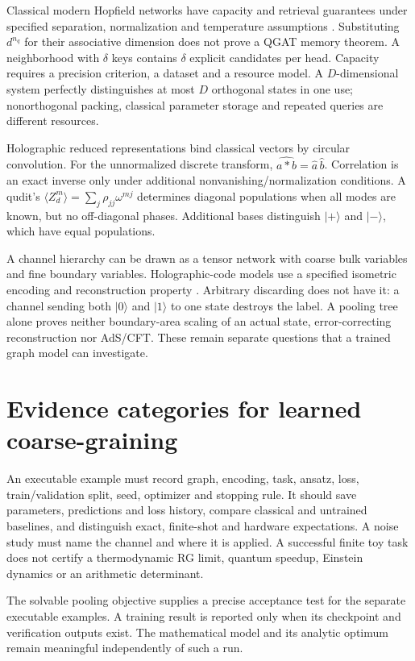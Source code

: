 \documentclass[11pt,oneside,openany]{book}
\theoremstyle{definition}\newtheorem{definition}[theorem]{Definition}
\theoremstyle{remark}\newtheorem{remark}[theorem]{Remark}
\begin{document}
Classical modern Hopfield networks have capacity and retrieval guarantees
under specified separation, normalization and temperature assumptions
\cite{PhysRamsauer}. Substituting $d^{n_q}$ for their associative dimension
does not prove a QGAT memory theorem. A neighborhood with $\delta$ keys
contains $\delta$ explicit candidates per head. Capacity requires a
precision criterion, a dataset and a resource model. A $D$-dimensional
system perfectly distinguishes at most $D$ orthogonal states in one use;
nonorthogonal packing, classical parameter storage and repeated queries
are different resources.

Holographic reduced representations bind classical vectors by circular
convolution. For the unnormalized discrete transform,
$\widehat{a*b}=\widehat a\,\widehat b$. Correlation is an exact inverse
only under additional nonvanishing/normalization conditions. A qudit's
$\langle Z_d^m\rangle=\sum_j\rho_{jj}\omega^{mj}$ determines diagonal
populations when all modes are known, but no off-diagonal phases. Additional
bases distinguish $|+\rangle$ and $|-\rangle$, which have equal populations.

A channel hierarchy can be drawn as a tensor network with coarse bulk
variables and fine boundary variables. Holographic-code models use a
specified isometric encoding and reconstruction property
\cite{PhysPastawski}. Arbitrary discarding does not have it: a channel
sending both $|0\rangle$ and $|1\rangle$ to one state destroys the label.
A pooling tree alone proves neither boundary-area scaling of an actual
state, error-correcting reconstruction nor AdS/CFT. These remain separate
questions that a trained graph model can investigate.

\section{Evidence categories for learned coarse-graining}
An executable example must record graph, encoding, task, ansatz, loss,
train/validation split, seed, optimizer and stopping rule. It should save
parameters, predictions and loss history, compare classical and untrained
baselines, and distinguish exact, finite-shot and hardware expectations.
A noise study must name the channel and where it is applied. A successful
finite toy task does not certify a thermodynamic RG limit, quantum speedup,
Einstein dynamics or an arithmetic determinant.

The solvable pooling objective supplies a precise acceptance test for the
separate executable examples. A training result is reported only when
its checkpoint and verification outputs exist. The mathematical model and
its analytic optimum remain meaningful independently of such a run.
\end{document}

